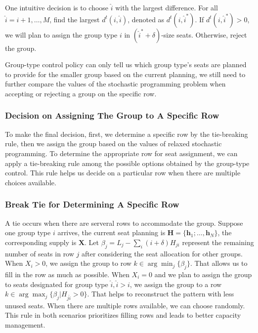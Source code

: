 One intuitive decision is to choose $\hat{i}$ with the largest difference. For all $\hat{i} = i+1, \ldots, M$, find the largest $d^{t}(i,\hat{i})$, denoted as $d^{t}(i,\hat{i}^{*})$. If $d^{t}(i,\hat{i}^{*}) >0$, we will plan to assign the group type $i$ in $(\hat{i}^{*}+\delta)$-size seats. Otherwise, reject the group.

Group-type control policy can only tell us which group type's seats are planned to provide for the smaller group based on the current planning, we still need to further compare the values of the stochastic programming problem when accepting or rejecting a group on the specific row. 

\subsubsection{Decision on Assigning The Group to A Specific Row}
To make the final decision, first, we determine a specific row by the tie-breaking rule, then we assign the group based on the values of relaxed stochastic programming. To determine the appropriate row for seat assignment, we can apply a tie-breaking rule among the possible options obtained by the group-type control. This rule helps us decide on a particular row when there are multiple choices available. 

\subsubsection*{Break Tie for Determining A Specific Row}
A tie occurs when there are serveral rows to accommodate the group. Suppose one group type $i$ arrives, the current seat planning is $\bm{H} = \{\bm{h}_{1}; \ldots, \bm{h}_{N}\}$, the corresponding supply is $\bm{X}$. Let $\beta_{j} = L_j - \sum_{i} (i+\delta) H_{ji}$ represent the remaining number of seats in row $j$ after considering the seat allocation for other groups. When $X_{i} > 0$, we assign the group to row $k \in \arg \min_{j} \{\beta_{j}\}$. That allows us to fill in the row as much as possible. When $X_{i} = 0$ and we plan to assign the group to seats designated for group type $\hat{i}, \hat{i}>i$, we assign the group to a row $k \in \arg \max_{j} \{\beta_{j}| H_{j \hat{i}}>0\}$. That helps to reconstruct the pattern with less unused seats. When there are multiple rows available, we can choose randomly. This rule in both scenarios prioritizes filling rows and leads to better capacity management.

